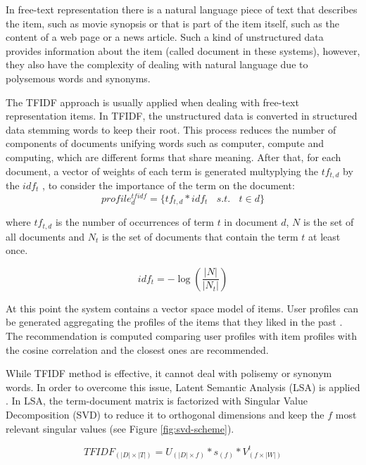 \documentclass[preprint]{elsarticle}
\begin{document}
\begin{spacing}{1.5}
In free-text representation there is a natural language piece of text that describes the item, such as movie synopsis or that is part of the item itself, such as the content of a web page or a news article. Such a kind of unstructured data provides information about the item (called document in these systems), however, they also have the complexity of dealing with natural language due to polysemous words and synonyms.

The TFIDF approach \cite{Erra2015} is usually applied when dealing with free-text representation items. In TFIDF, the unstructured data is converted in structured data stemming words \cite{Porter1980} to keep their root. This process reduces the number of components of documents unifying words such as computer, compute and computing, which are different forms that share meaning. After that, for each document, a vector of weights of each term is generated multyplying the $tf_{t,d}$ by the $idf_{t}$ \cite{Lops2011}, to consider the importance of the term on the document:
\begin{equation}
	profile^{tfidf}_{d} = \{tf_{t,d}*idf_{t}~~~~s.t.~~~~ t \in d \}
	\label{eq:document-profile-tfidf}
\end{equation}

\noindent where $tf_{t,d}$ is the number of occurrences of term $t$ in document $d$, $N$ is the set of all documents and $N_t$ is the set of documents that contain the term $t$ at least once.

\begin{equation}
	idf_t = -\log \left( \frac{|N|}{|N_t|}\right)
	\label{eq:document-profile-tfidf-idf}
\end{equation}

At this point the system contains a vector space model of items. User profiles can be generated aggregating the profiles of the items that they liked in the past \cite{Symeonidis2007}. The recommendation is computed comparing user profiles with item profiles with the cosine correlation and the closest ones are recommended. 

While TFIDF method is effective, it cannot deal with polisemy or synonym words. In order to overcome this issue, Latent Semantic Analysis (LSA) is applied \cite{deGemmis2015}. In LSA, the term-document matrix is factorized with Singular Value Decomposition (SVD) to reduce it to orthogonal dimensions and keep the $f$ most relevant singular values (see Figure \ref{fig:svd-scheme}).

\begin{equation}
	TFIDF_{(|D|\times|T|)} = U_{(|D|\times f)} * s_{(f)} * V^t_{(f \times |W|)}
	\label{eq:svd}
\end{equation}


\end{spacing}
\end{document}
